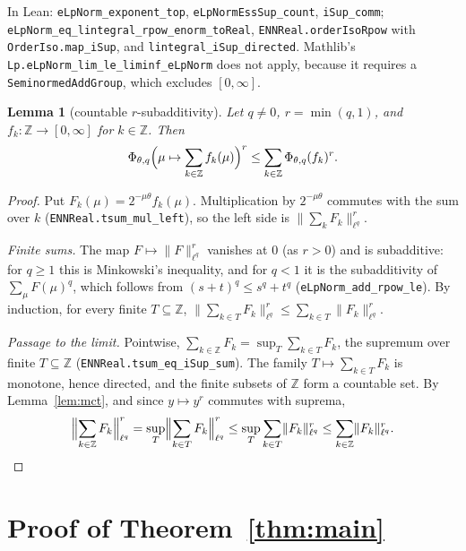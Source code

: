 \documentclass[11pt]{article}
\newtheorem{lemma}[theorem]{Lemma}
\theoremstyle{definition}
\theoremstyle{remark}
\newcommand{\norm}[2]{\lVert #1\rVert_{#2}}
\newcommand{\Z}{\mathbb Z}
\begin{document}
In Lean: \texttt{eLpNorm\_exponent\_top}, \texttt{eLpNormEssSup\_count}, \texttt{iSup\_comm};
\texttt{eLpNorm\_eq\_lintegral\_rpow\_enorm\_toReal}, \texttt{ENNReal.orderIsoRpow} with
\texttt{OrderIso.map\_iSup}, and \texttt{lintegral\_iSup\_directed}. Mathlib's
\texttt{Lp.eLpNorm\_lim\_le\_liminf\_eLpNorm} does not apply, because it requires a
\texttt{SeminormedAddGroup}, which excludes \([0,\infty]\).

\begin{lemma}[countable \(r\)-subadditivity]\label{lem:countable}
  Let \(q \ne 0\), \(r = \min(q,1)\), and \(f_k \colon \Z \to [0,\infty]\) for \(k \in \Z\).
  Then
  \[
    \Phi_{\theta,q}\Bigl(\mu \mapsto \sum_{k \in \Z} f_k(\mu)\Bigr)^r
    \le \sum_{k \in \Z} \Phi_{\theta,q}(f_k)^r .
  \]
\end{lemma}

\begin{proof}
  Put \(F_k(\mu) = 2^{-\mu\theta} f_k(\mu)\). Multiplication by \(2^{-\mu\theta}\) commutes with
  the sum over \(k\) (\texttt{ENNReal.tsum\_mul\_left}), so the left side is
  \(\norm{\sum_k F_k}{\ell^q}^r\).

  \emph{Finite sums.} The map \(F \mapsto \norm{F}{\ell^q}^r\) vanishes at \(0\) (as \(r > 0\))
  and is subadditive: for \(q \ge 1\) this is Minkowski's inequality, and for \(q < 1\) it is the
  subadditivity of \(\sum_\mu F(\mu)^q\), which follows from \((s+t)^q \le s^q + t^q\)
  (\texttt{eLpNorm\_add\_rpow\_le}). By induction, for every finite \(T \subseteq \Z\),
  \(\norm{\sum_{k \in T} F_k}{\ell^q}^r \le \sum_{k \in T}\norm{F_k}{\ell^q}^r\).

  \emph{Passage to the limit.} Pointwise, \(\sum_{k \in \Z} F_k = \sup_T \sum_{k \in T} F_k\),
  the supremum over finite \(T \subseteq \Z\) (\texttt{ENNReal.tsum\_eq\_iSup\_sum}). The family
  \(T \mapsto \sum_{k\in T} F_k\) is monotone, hence directed, and the finite subsets of \(\Z\)
  form a countable set. By Lemma~\ref{lem:mct}, and since \(y \mapsto y^r\) commutes with suprema,
  \[
    \Bigl\lVert\sum_{k \in \Z} F_k\Bigr\rVert_{\ell^q}^r
    = \sup_T \Bigl\lVert\sum_{k \in T} F_k\Bigr\rVert_{\ell^q}^r
    \le \sup_T \sum_{k \in T}\norm{F_k}{\ell^q}^r
    \le \sum_{k \in \Z}\norm{F_k}{\ell^q}^r . \qedhere
  \]
\end{proof}

\section{Proof of Theorem~\ref{thm:main}}
\end{document}
